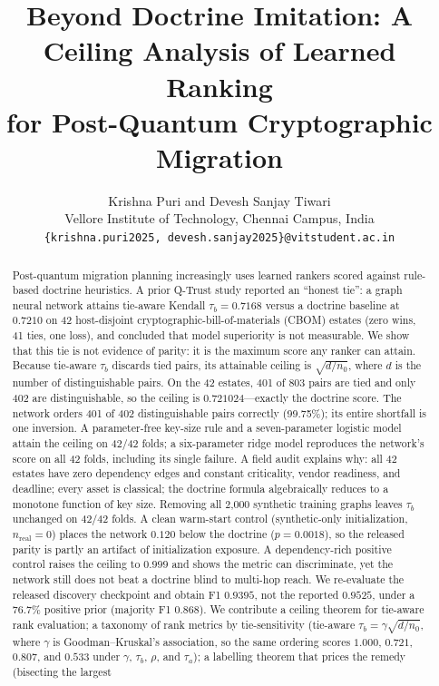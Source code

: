 \documentclass[conference,10pt]{IEEEtran}
\title{Beyond Doctrine Imitation: A Ceiling Analysis of Learned Ranking\\
for Post-Quantum Cryptographic Migration}
\author{Krishna Puri and Devesh Sanjay Tiwari\\
Vellore Institute of Technology, Chennai Campus, India\\
\texttt{\{krishna.puri2025, devesh.sanjay2025\}@vitstudent.ac.in}}
\newcommand{\tb}{\tau_b}
\newcommand{\distinct}{d}
\newcommand{\nzero}{n_0}
\begin{document}
\maketitle

\begin{abstract}
Post-quantum migration planning increasingly uses learned rankers scored against rule-based
doctrine heuristics. A prior Q-Trust study reported an ``honest tie'': a graph neural network
attains tie-aware Kendall $\tb=0.7168$ versus a doctrine baseline at $0.7210$ on 42
host-disjoint cryptographic-bill-of-materials (CBOM) estates (zero wins, 41 ties, one loss),
and concluded that model superiority is not measurable. We show that this tie is not evidence
of parity: it is the maximum score any ranker can attain. Because tie-aware $\tb$ discards
tied pairs, its attainable ceiling is $\sqrt{\distinct/\nzero}$, where $\distinct$ is the
number of distinguishable pairs. On the 42 estates, 401 of 803 pairs are tied and only 402 are
distinguishable, so the ceiling is $0.721024$---exactly the doctrine score. The network orders
401 of 402 distinguishable pairs correctly (99.75\%); its entire shortfall is one inversion. A
parameter-free key-size rule and a seven-parameter logistic model attain the ceiling on 42/42
folds; a six-parameter ridge model reproduces the network's score on all 42 folds, including
its single failure. A field audit explains why: all 42 estates have zero dependency edges and
constant criticality, vendor readiness, and deadline; every asset is classical; the doctrine
formula algebraically reduces to a monotone function of key size. Removing all 2,000 synthetic
training graphs leaves $\tb$ unchanged on 42/42 folds. A clean warm-start control
(synthetic-only initialization, $n_{\text{real}}=0$) places the network $0.120$ below the
doctrine ($p=0.0018$), so the released parity is partly an artifact of initialization
exposure. A dependency-rich positive control raises the ceiling to $0.999$ and shows the metric
can discriminate, yet the network still does not beat a doctrine blind to multi-hop reach. We
re-evaluate the released discovery checkpoint and obtain F1 $0.9395$, not the reported
$0.9525$, under a $76.7\%$ positive prior (majority F1 $0.868$). We contribute a ceiling
theorem for tie-aware rank evaluation; a taxonomy of rank metrics by tie-sensitivity
(tie-aware $\tb=\gamma\sqrt{\distinct/\nzero}$, where $\gamma$ is Goodman--Kruskal's
association, so the same ordering scores $1.000$, $0.721$, $0.807$, and $0.533$ under $\gamma$,
$\tb$, $\rho$, and $\tau_a$); a labelling theorem that prices the remedy (bisecting the largest

\end{abstract}
\end{document}
